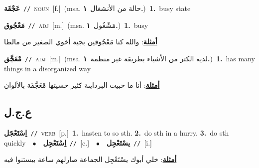 \documentclass[10pt,a4paper,twoside]{article} %
\begin{document}
\begin{multicols}{2}
{\setlength\topsep{0pt}\textbf{\foreignlanguage{arabic}{عَجْقَة}}\ {\color{gray}\texttt{//}\color{black}}\ \textsc{noun}\ [f.]\ \color{gray}(msa. \foreignlanguage{arabic}{حالة من الأنشغال}~\foreignlanguage{arabic}{\textbf{١.}})\color{black}\ \textbf{1.}~busy state\ } \vspace{2mm}

{\setlength\topsep{0pt}\textbf{\foreignlanguage{arabic}{مَعْجُوق}}\ {\color{gray}\texttt{//}\color{black}}\ \textsc{adj}\ [m.]\ \color{gray}(msa. \foreignlanguage{arabic}{مَشْغُول}~\foreignlanguage{arabic}{\textbf{١.}})\color{black}\ \textbf{1.}~busy\  \begin{flushright}\color{gray}\foreignlanguage{arabic}{\textbf{\underline{\foreignlanguage{arabic}{أمثلة}}}: والله كنا مَعْجُوقين بجية أخوي الصغير من مالطا}\end{flushright}\color{black}} \vspace{2mm}

{\setlength\topsep{0pt}\textbf{\foreignlanguage{arabic}{مْعَجَّق}}\ {\color{gray}\texttt{//}\color{black}}\ \textsc{adj}\ [m.]\ \color{gray}(msa. \foreignlanguage{arabic}{لديه الكثر من الأشياء بطريقة غير منظمة}~\foreignlanguage{arabic}{\textbf{١.}})\color{black}\ \textbf{1.}~has many things in a disorganized way\  \begin{flushright}\color{gray}\foreignlanguage{arabic}{\textbf{\underline{\foreignlanguage{arabic}{أمثلة}}}: أنا ما حبيت البردايىة كثير حسيتها مْعَجَّقَة بالألوان}\end{flushright}\color{black}} \vspace{2mm}

\vspace{-3mm}
\subsection*{\color{blue}\foreignlanguage{arabic}{ع.ج.ل}\color{blue}{}} 

{\setlength\topsep{0pt}\textbf{\foreignlanguage{arabic}{اِسْتَعْجَل}}\ {\color{gray}\texttt{//}\color{black}}\ \textsc{verb}\ [p.]\ \textbf{1.}~hasten to so sth.  \textbf{2.}~do sth in a hurry.  \textbf{3.}~do sth quickly\ \ $\bullet$\ \ \setlength\topsep{0pt}\textbf{\foreignlanguage{arabic}{اِسْتَعْجِل}}\ {\color{gray}\texttt{//}\color{black}}\ [c.]\ \ $\bullet$\ \ \setlength\topsep{0pt}\textbf{\foreignlanguage{arabic}{يسْتَعْجِل}}\ {\color{gray}\texttt{//}\color{black}}\ [i.]\  \begin{flushright}\color{gray}\foreignlanguage{arabic}{\textbf{\underline{\foreignlanguage{arabic}{أمثلة}}}: خلي أبوك يسْتَعْجِل الجماعة صارلهم ساعة بيستنوا فيه}\end{flushright}\color{black}} \vspace{2mm}


\end{multicols}
\end{document}
